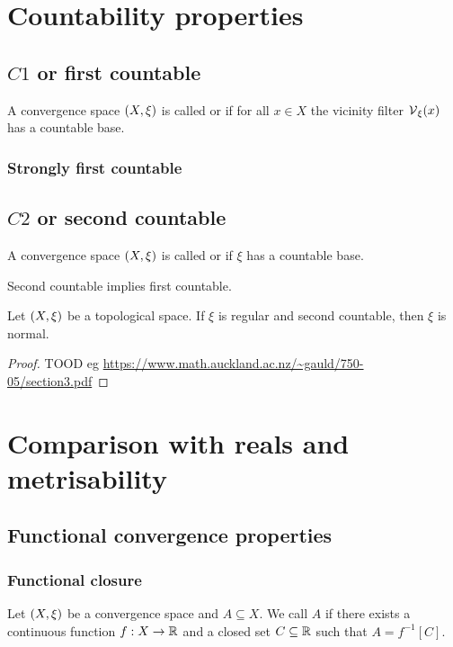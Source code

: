 \section{Countability properties}
\subsection{$C1$ or first countable}
\begin{definition}
A convergence space $\left( X, \xi \right)$ is called  or  if for all $x\in X$ the vicinity filter $\operatorname{\mathcal{V}}_\xi(x)$ has a countable base.
\end{definition}

\subsubsection{Strongly first countable}

\subsection{$C2$ or second countable}
\begin{definition}
A convergence space $\left( X, \xi \right)$ is called  or  if $\xi$ has a countable base.
\end{definition}

\begin{lemma}
Second countable implies first countable.
\end{lemma}

\begin{proposition} \label{countableRegularityImpliesNormality}
Let $\left( X,\xi \right)$ be a topological space. If $\xi$ is regular and second countable, then $\xi$ is normal.
\end{proposition}
\begin{proof}
TOOD eg \url{https://www.math.auckland.ac.nz/~gauld/750-05/section3.pdf}
\end{proof}

\section{Comparison with reals and metrisability}
\subsection{Functional convergence properties}
\subsubsection{Functional closure}
\begin{definition}
Let $\left( X,\xi \right)$ be a convergence space and $A\subseteq X$. We call $A$  if there exists a continuous function $f: X\to \mathbb{R}$ and a closed set $C\subseteq \mathbb{R}$ such that $A = f^{-1}[C]$.
\end{definition}

